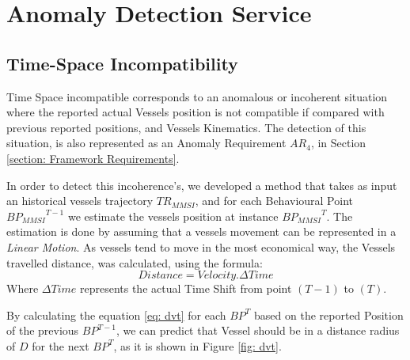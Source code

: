 



\section{Anomaly Detection Service}

\subsection{Time-Space Incompatibility}
\label{subsection: 4 Time-Space Incompatibility}
Time Space incompatible corresponds to an anomalous or incoherent situation where the reported actual Vessels position is not compatible if compared with previous reported positions, and Vessels Kinematics. The detection of this situation, is also represented as an Anomaly Requirement \emph{$AR_4$}, in Section \ref{section: Framework Requirements}.

In order to detect this incoherence's, we developed a method that takes as input an historical vessels trajectory $TR_{MMSI}$, and for each Behavioural Point ${BP_{MMSI}}^{T-1}$ we estimate the vessels position at instance ${BP_{MMSI}}^{T}$.
The estimation is done by assuming that a vessels movement can be represented in a \emph{Linear Motion}. As vessels tend to move in the most economical way, the Vessels travelled distance, was calculated, using the formula:
\begin{equation}
Distance = Velocity . \Delta Time
\label{eq: dvt}
\end{equation}
Where $\Delta Time$ represents the actual Time Shift from point $(T-1)$ to $(T)$.

By calculating the equation \ref{eq: dvt} for each $BP^{T}$ based on the reported Position of the previous $BP^{T-1}$, we can predict that Vessel should be in a distance radius of $D$ for the next $BP^T$, as it is shown in Figure \ref{fig: dvt}.

